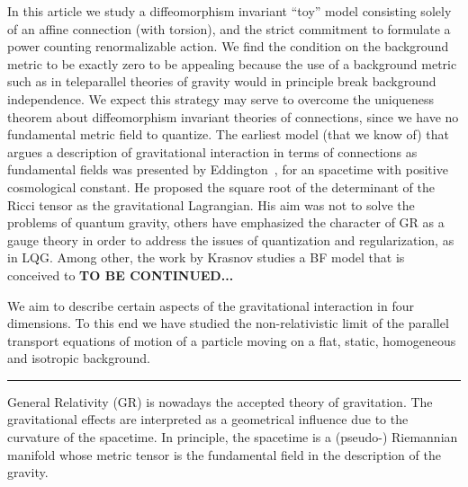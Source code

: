 \documentclass[twocolumn,
  showpacs,showkeys,prd,superscriptaddress]{revtex4-1}
\begin{document}
In this article we study a diffeomorphism invariant ``toy'' model  consisting  solely of an affine connection  (with torsion), and the strict commitment to formulate a power counting renormalizable action. %
We find the condition on the background metric to be exactly zero to be appealing because the use of a background metric such as in teleparallel theories of gravity would in principle break background independence. %
We expect  this strategy may serve to overcome  the uniqueness theorem about diffeomorphism invariant theories of connections, since we  have no fundamental metric field to quantize. The earliest model (that we know of) that argues  a description of gravitational interaction in terms of connections as fundamental fields  was presented by Eddington~\cite{Eddington1923math}, for an spacetime with positive cosmological constant. He proposed the square root of the determinant of the Ricci tensor as the gravitational Lagrangian. His aim was not to solve the problems of quantum gravity,  others have emphasized the character of GR as a gauge theory in order to address the issues of quantization and regularization, as in LQG. Among other, the work by  Krasnov studies a BF model that is conceived to {\bfseries \color{blue} TO BE CONTINUED...}

We aim to describe certain aspects of the gravitational interaction in four dimensions. To this end we have studied the non-relativistic limit of the parallel transport equations of motion of a particle moving on a flat, static, homogeneous and isotropic background.

\vspace*{5mm}

\hrule

\vspace*{5mm}

General Relativity (GR) is nowadays the accepted theory of gravitation. The gravitational effects are interpreted as a geometrical influence due to the curvature of the spacetime. In principle, the spacetime is a (pseudo-) Riemannian manifold whose metric tensor is the fundamental field in the description of the gravity.
\end{document}
